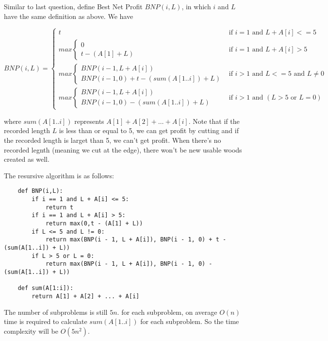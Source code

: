 \documentclass[12pt,a4paper]{article}
\newcommand{\question}[1]{\bigskip\noindent{\textbf{Q{#1} solution}}}
\begin{document}
\question{18.B}

Similar to last question, define Best Net Profit $BNP(i ,L)$, in which $i$ and $L$ have the same definition as above. We have

\begin{equation*}
	BNP(i, L) = 
	\begin{cases}
		t & \mbox{if } i = 1 \mbox{ and } L + A[i] <= 5 \\
		max
		\begin{cases}
			0 \\
			t - (A[1] + L)
		\end{cases} & \mbox{if } i = 1 \mbox{ and } L + A[i] > 5  \\
		max
		\begin{cases}
			BNP(i - 1, L + A[i]) \\
			BNP(i - 1, 0) + t - (sum(A[1..i]) + L)
		\end{cases} & \mbox{if } i > 1 \mbox{ and } L <= 5 \mbox{ and } L \neq 0 \\
		max
		\begin{cases}
		BNP(i - 1, L + A[i]) \\
		BNP(i - 1, 0) - (sum(A[1..i]) + L) 
		\end{cases} & \mbox{if } i > 1 \mbox { and } (L > 5 \mbox{ or } L = 0)
	\end{cases}
\end{equation*}

where $sum(A[1..i])$ represents $A[1] + A[2] + \dots + A[i]$. Note that if the recorded length $L$ is less than or equal to 5, we can get profit by cutting and if the recorded length is larget than 5, we can't get profit. When there's no recorded legnth (meaning we cut at the edge), there won't be new usable woods created as well.

The resursive algorithm is as follows:
\begin{lstlisting}
	def BNP(i,L):
		if i == 1 and L + A[i] <= 5:
			return t
		if i == 1 and L + A[i] > 5:
			return max(0,t - (A[1] + L))
		if L <= 5 and L != 0:
			return max(BNP(i - 1, L + A[i]), BNP(i - 1, 0) + t - (sum(A[1..i]) + L))
		if L > 5 or L = 0:
			return max(BNP(i - 1, L + A[i]), BNP(i - 1, 0) - (sum(A[1..i]) + L))
	
	def sum(A[1:i]):
		return A[1] + A[2] + ... + A[i]

\end{lstlisting}

The number of subproblems is still $5n$. for each subproblem, on average $O(n)$ time is required to calculate $sum(A[1..i])$ for each subproblem. So the time complexity will be $O(5n^2)$.
\end{document}
